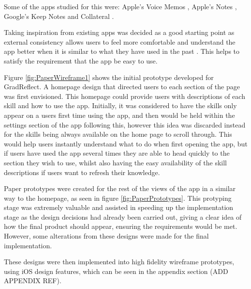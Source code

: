 \documentclass{l4proj}
\begin{document}
Some of the apps studied for this were: Apple's Voice Memos \citep{apple_inc_voice_2021}, Apple's Notes \citep{apple_inc_notes_2021}, Google's Keep Notes \citep{google_llc_google_2021} and Collateral \citep{vargas_collateral_2021}.

Taking inspiration from existing apps was decided as a good starting point as external consistency allows users to feel more comfortable and understand the app better when it is similar to what they have used in the past \citep{schlatter_visual_2013}. This helps to satisfy the requirement that the app be easy to use. 

Figure \ref{fig:PaperWireframe1} shows the initial prototype developed for GradReflect. A homepage design that directed users to each section of the page was first envisioned. This homepage could provide users with descriptions of each skill and how to use the app. Initially, it was considered to have the skills only appear on a users first time using the app, and then would be held within the settings section of the app following this, however this idea was discarded instead for the skills being always available on the home page to scroll through. This would help users instantly understand what to do when first opening the app, but if users have used the app several times they are able to head quickly to the section they wish to use, whilst also having the easy availability of the skill descriptions if users want to refresh their knowledge. 

Paper prototypes were created for the rest of the views of the app in a similar way to the homepage, as seen in figure \ref{fig:PaperPrototypes}. This protyping stage was extremely valuable and assisted in speeding up the implementation stage as the design decisions had already been carried out, giving a clear idea of how the final product should appear, ensuring the requirements would be met. However, some alterations from these designs were made for the final implementation.

These designs were then implemented into high fidelity wireframe prototypes, using iOS design features, which can be seen in the appendix section (ADD APPENDIX REF).
\end{document}
